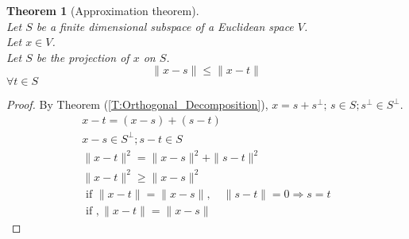 \documentclass[twoside]{amsart}
\theoremstyle{plain}
\newtheorem{theorem}{Theorem}
\theoremstyle{definition}
\begin{document}
\begin{theorem}[Approximation theorem] \quad \\
  Let $S$ be a finite dimensional subspace of a Euclidean space $V$.  \\
  Let $x\in V$. \\  
  Let $S$ be the projection of $x$ on $S$.  \\
  \begin{equation*}
    \| x -s \| \leq \| x-t \|
  \end{equation*}
  $\forall t \in S$
\end{theorem}
\begin{proof}
By Theorem (\ref{T:Orthogonal_Decomposition}), $x = s+ s^{\perp}; \, s \in S; s^{\perp} \in S^{\perp}$.  
\begin{gather*}
  x-t = (x-s) + (s-t) \\
  x-s \in S^{\perp}; s-t \in S \\
  \| x -t \|^2 = \| x -s \|^2 + \| s-t \|^2 \\
  \| x - t \|^2 \geq \| x - s \|^2 \\
  \text{ if } \| x - t \| = \| x - s \| , \quad \| s - t \| = 0 \Longrightarrow  s =t \\
  \text{ if }, \| x - t \| = \| x  - s \|
\end{gather*}
\end{proof}
\end{document}
